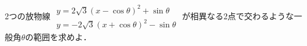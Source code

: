 \documentclass[../../main.tex]{subfiles}
\begin{document}
2つの放物線
$
\begin{matrix}
  y=2\sqrt3(x-\cos\theta)^2+\sin\theta \\
  y=-2\sqrt3(x+\cos\theta)^2-\sin\theta
\end{matrix}$
が相異なる2点で交わるような一般角$\theta$の範囲を求めよ．
\end{document}
